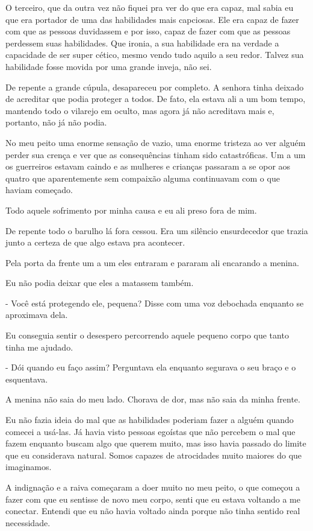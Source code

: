 O terceiro, que da outra vez não fiquei pra ver do que era capaz, mal sabia eu que era portador de uma das habilidades mais capciosas. Ele era capaz de fazer com que as pessoas duvidassem e por isso, capaz de fazer com que as pessoas perdessem suas habilidades. Que ironia, a sua habilidade era na verdade a capacidade de ser super cético, mesmo vendo tudo aquilo a seu redor. Talvez sua habilidade fosse movida por uma grande inveja, não sei.

De repente a grande cúpula, desapareceu por completo. A senhora tinha deixado de acreditar que podia proteger a todos. De fato, ela estava ali a um bom tempo, mantendo todo o vilarejo em oculto, mas agora já não acreditava mais e, portanto, não já não podia.

No meu peito uma enorme sensação de vazio, uma enorme tristeza ao ver alguém perder sua crença e ver que as consequências tinham sido catastróficas. Um a um os guerreiros estavam caindo e as mulheres e crianças passaram a se opor aos quatro que aparentemente sem compaixão alguma continuavam com o que haviam começado.

Todo aquele sofrimento por minha causa e eu ali preso fora de mim.

De repente todo o barulho lá fora cessou. Era um silêncio ensurdecedor que trazia junto a certeza de que algo estava pra acontecer.

Pela porta da frente um a um eles entraram e pararam ali encarando a menina.

Eu não podia deixar que eles a matassem também.

- Você está protegendo ele, pequena? Disse com uma voz debochada enquanto se aproximava dela.

Eu conseguia sentir o desespero percorrendo aquele pequeno corpo que tanto tinha me ajudado.

- Dói quando eu faço assim? Perguntava ela enquanto segurava o seu braço e o esquentava.

A menina não saia do meu lado. Chorava de dor, mas não saia da minha frente.

Eu não fazia ideia do mal que as habilidades poderiam fazer a alguém quando comecei a usá-las. Já havia visto pessoas egoístas que não percebem o mal que fazem enquanto buscam algo que querem muito, mas isso havia passado do limite que eu considerava natural. Somos capazes de atrocidades muito maiores do que imaginamos.

A indignação e a raiva começaram a doer muito no meu peito, o que começou a fazer com que eu sentisse de novo meu corpo, senti que eu estava voltando a me conectar. Entendi que eu não havia voltado ainda porque não tinha sentido real necessidade. 

